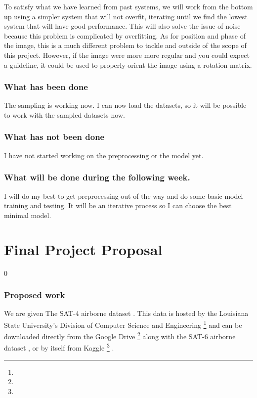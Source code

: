 \documentclass[11pt]{report}
\let\oldpart\part%
\renewcommand*\part[1]{\oldpart{#1}\setcounter{section}0}%
\begin{document}
To satisfy what we have learned from past systems,
we will work from the bottom up using a simpler system that will not overfit,
iterating until we find the lowest system that will have good performance.
This will also solve the issue of noise because this problem is complicated by overfitting.
As for position and phase of the image, this is a much different problem to tackle and outside of the scope of this project.
However, if the image were more more regular and you could expect a guideline,
it could be used to properly orient the image using a rotation matrix.

\section{What has been done}

The sampling is working now.
I can now load the datasets,
so it will be possible to work with the sampled datasets now.

\section{What has not been done}

I have not started working on the preprocessing or the model yet.

\section{What will be done during the following week.}

I will do my best to get preprocessing out of the way and do some basic model training and testing.
It will be an iterative process
so I can choose the best minimal model.

\part{Final Project Proposal}

\section{Proposed work}

We are given
The SAT-4 airborne dataset%
\cite{Basu2015a}.
This data is hosted by the Louisiana State University's Division of Computer Science and Engineering%
\footnote{%
}
and can be downloaded directly from the Google Drive%
\footnote{%
}
along with the SAT-6 airborne dataset%
, or by itself from Kaggle%
\footnote{%
}%
.
\end{document}
